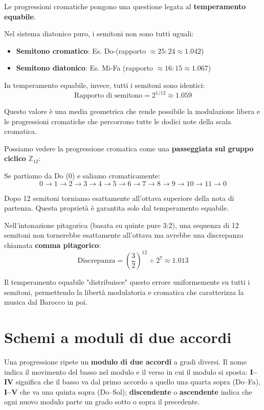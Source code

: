 \begin{matematica}
	Le progressioni cromatiche pongono una questione legata al \textbf{temperamento equabile}.
	
	Nel sistema diatonico puro, i semitoni non sono tutti uguali:
	\begin{itemize}
		\item \textbf{Semitono cromatico}: Es. Do-\Dodiesis  (rapporto $\approx 25:24 \approx 1.042$)
		\item \textbf{Semitono diatonico}: Es. Mi-Fa (rapporto $\approx 16:15 \approx 1.067$)
	\end{itemize}
	
	In temperamento equabile, invece, tutti i semitoni sono identici:
	\[
	\text{Rapporto di semitono} = 2^{1/12} \approx 1.059
	\]
	
	Questo valore è una media geometrica che rende possibile la modulazione libera e le progressioni cromatiche che percorrono tutte le dodici note della scala cromatica.
	
	Possiamo vedere la progressione cromatica come una \textbf{passeggiata sul gruppo ciclico} $\mathbb{Z}_{12}$:
	
	Se partiamo da Do (0) e saliamo cromaticamente:
	\[
	0 \rightarrow 1 \rightarrow 2 \rightarrow 3 \rightarrow 4 \rightarrow 5 \rightarrow 6 \rightarrow 7 \rightarrow 8 \rightarrow 9 \rightarrow 10 \rightarrow 11 \rightarrow 0
	\]
	
	Dopo 12 semitoni torniamo esattamente all'ottava superiore della nota di partenza. Questa proprietà è garantita solo dal temperamento equabile.
	
	Nell'intonazione pitagorica (basata su quinte pure 3:2), una sequenza di 12 semitoni non tornerebbe esattamente all'ottava ma avrebbe una discrepanza chiamata \textbf{comma pitagorico}:
	\[
	\text{Discrepanza} = \left(\frac{3}{2}\right)^{12} \div 2^7 \approx 1.013
	\]
	
	Il temperamento equabile "distribuisce" questo errore uniformemente su tutti i semitoni, permettendo la libertà modulatoria e cromatica che caratterizza la musica dal Barocco in poi.
\end{matematica}

\section{Schemi a moduli di due accordi}
\label{sec:schemi_moduli}

Una progressione ripete un \textbf{modulo di due accordi} a gradi diversi. Il nome indica il movimento del basso nel modulo e il verso in cui il modulo si sposta: \textbf{I--IV} significa che il basso va dal primo accordo a quello una quarta sopra (Do--Fa), \textbf{I--V} che va una quinta sopra (Do--Sol); \textbf{discendente} o \textbf{ascendente} indica che ogni nuovo modulo parte un grado sotto o sopra il precedente.

